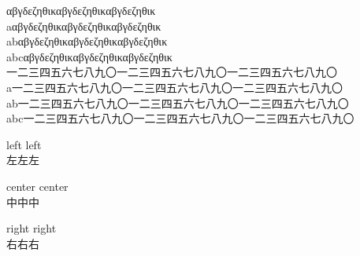 \documentclass{ujarticle}
\begin{document}
αβγδεζηθικαβγδεζηθικαβγδεζηθικ\\
aαβγδεζηθικαβγδεζηθικαβγδεζηθικ\\
abαβγδεζηθικαβγδεζηθικαβγδεζηθικ\\
abcαβγδεζηθικαβγδεζηθικαβγδεζηθικ\\

一二三四五六七八九〇一二三四五六七八九〇一二三四五六七八九〇\\
a一二三四五六七八九〇一二三四五六七八九〇一二三四五六七八九〇\\
ab一二三四五六七八九〇一二三四五六七八九〇一二三四五六七八九〇\\
abc一二三四五六七八九〇一二三四五六七八九〇一二三四五六七八九〇\\

\begin{flushleft}
left left\\
左左左
\end{flushleft}

\begin{center}
center center\\
中中中
\end{center}

\begin{flushright}
right right\\
右右右
\end{flushright}
\end{document}
